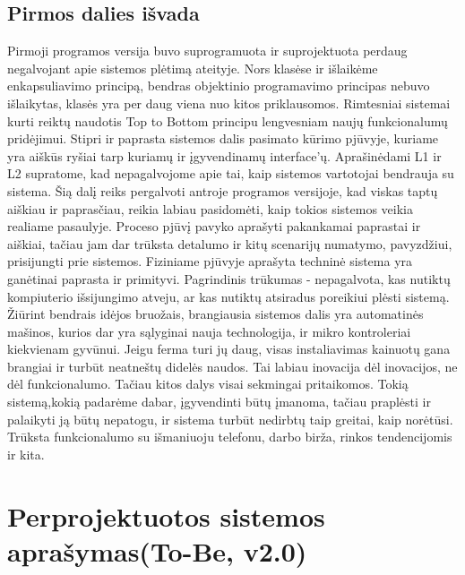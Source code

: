 \documentclass[oneside]{VUMIFPSkursinis}
\begin{document}
\subsection{Pirmos dalies išvada}
Pirmoji programos versija buvo suprogramuota ir suprojektuota perdaug negalvojant apie sistemos plėtimą ateityje. Nors klasėse ir išlaikėme enkapsuliavimo principą, bendras objektinio programavimo principas nebuvo išlaikytas, klasės yra per daug viena nuo kitos priklausomos. Rimtesniai sistemai kurti reiktų naudotis Top to Bottom principu lengvesniam naujų funkcionalumų pridėjimui. Stipri ir paprasta sistemos dalis pasimato kūrimo pjūvyje, kuriame yra aiškūs ryšiai tarp kuriamų ir įgyvendinamų interface'ų. Aprašinėdami L1 ir L2 supratome, kad nepagalvojome apie tai, kaip sistemos vartotojai bendrauja su sistema. Šią dalį reiks pergalvoti antroje programos versijoje, kad viskas taptų aiškiau ir paprasčiau, reikia labiau pasidomėti, kaip tokios sistemos veikia realiame pasaulyje. Proceso pjūvį pavyko aprašyti pakankamai paprastai ir aiškiai, tačiau jam dar trūksta detalumo ir kitų scenarijų numatymo, pavyzdžiui, prisijungti prie sistemos. Fiziniame pjūvyje aprašyta techninė sistema yra ganėtinai paprasta ir primityvi. Pagrindinis trūkumas - nepagalvota, kas nutiktų kompiuterio išsijungimo atveju, ar kas nutiktų atsiradus poreikiui plėsti sistemą. Žiūrint bendrais idėjos bruožais, brangiausia sistemos dalis yra automatinės mašinos, kurios dar yra sąlyginai nauja technologija, ir mikro kontroleriai kiekvienam gyvūnui. Jeigu ferma turi jų daug, visas instaliavimas kainuotų gana brangiai ir turbūt neatneštų didelės naudos. Tai labiau inovacija dėl inovacijos, ne dėl funkcionalumo. Tačiau kitos dalys visai sekmingai pritaikomos. Tokią sistemą,kokią padarėme dabar, įgyvendinti būtų įmanoma, tačiau praplėsti ir palaikyti ją būtų nepatogu, ir sistema turbūt nedirbtų taip greitai, kaip norėtūsi. Trūksta funkcionalumo su išmaniuoju telefonu, darbo birža, rinkos tendencijomis ir kita. 

\pagebreak

\section{Perprojektuotos sistemos aprašymas(To-Be, v2.0)}
\end{document}
